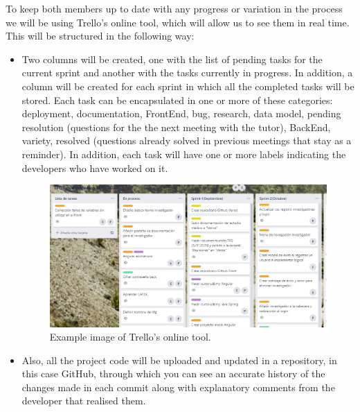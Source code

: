     To keep both members up to date with any progress or variation in the process we will be using Trello's online tool, which will allow us to see them in real time. This will be structured in the following way:
    
    \begin{itemize}
    \item Two columns will be created, one with the list of pending tasks for the current sprint and another with the tasks currently in progress. In addition, a column will be created for each sprint in which all the completed tasks will be stored. Each task can be encapsulated in one or more of these categories: deployment, documentation, FrontEnd, bug, research, data model, pending resolution (questions for the the next meeting with the tutor), BackEnd, variety, resolved (questions already solved in previous meetings that stay as a reminder). In addition, each task will have one or more labels indicating the developers who have worked on it.\newline

    
     \begin{figure}[h]
    \centering
     \includegraphics[width=1\textwidth]{images/Trello.jpg}
    \caption{Example image of Trello's online tool.}
    \end{figure}
    \newpage
    
    \item  Also, all the project code will be uploaded and updated in a repository, in this case GitHub\cite{github}, through which you can see an accurate history of the changes made in each commit along with explanatory comments from the developer that realised them.\newline


\end{itemize}
